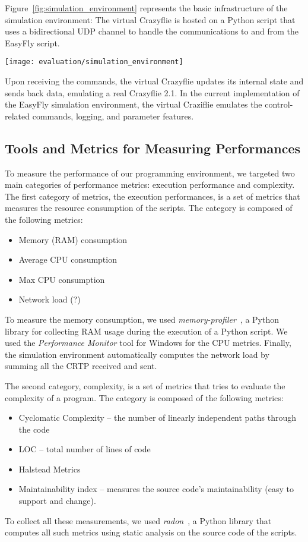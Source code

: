 Figure~\ref{fig:simulation_environment} represents the basic infrastructure of the simulation environment: 
The virtual Crazyflie is hosted on a Python script that uses a bidirectional UDP channel to handle the communications to and from the EasyFly script.

\begin{SCfigure}[\sidecaptionrelwidth][h]
    \texttt{[image: evaluation/simulation\_environment]}
    \caption{Structure of EasyFly simulation environment}\label{fig:simulation_environment}
\end{SCfigure}

Upon receiving the commands, the virtual Crazyflie updates its internal state and sends back data, emulating a real Crazyflie 2.1.
In the current implementation of the EasyFly simulation environment, the virtual Craziflie emulates the control-related commands, logging, and parameter features.

\subsection{Tools and Metrics for Measuring Performances}\label{subsec:performance_metrics}

To measure the performance of our programming environment, we targeted two main categories of performance metrics: execution performance and complexity.
The first category of metrics, the execution performances, is a set of metrics that measures the resource consumption of the scripts.
The category is composed of the following metrics:
\begin{itemize}
    \item Memory (RAM) consumption
    \item Average CPU consumption 
    \item Max CPU consumption
    \item Network load (?) 
\end{itemize}

To measure the memory consumption, we used \textit{memory-profiler}~\cite{memoryProfiler}, a Python library for collecting RAM usage during the execution of a Python script.
We used the \textit{Performance Monitor} tool for Windows for the CPU metrics. 
Finally, the simulation environment automatically computes the network load by summing all the CRTP received and sent.

The second category, complexity, is a set of metrics that tries to evaluate the complexity of a program.
The category is composed of the following metrics:
\begin{itemize}
    \item Cyclomatic Complexity -- the number of linearly independent paths through the code
    \item LOC -- total number of lines of code
    \item Halstead Metrics 
    \item Maintainability index -- measures the source code's maintainability (easy to support and change).
\end{itemize}

To collect all these measurements, we used \textit{radon}~\cite{radon}, a Python library that computes all such metrics using static analysis on the source code of the scripts.